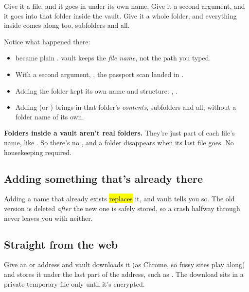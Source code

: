 \documentclass[10pt,oneside,openany]{book}
\begin{document}
Give it a file, and it goes in under its own name. Give it a second argument,
and it goes into that folder inside the vault. Give it a whole folder, and
everything inside comes along too, subfolders and all.


Notice what happened there:

\begin{itemize}
  \item {} became plain .
        vault keeps the \emph{file name}, not the path you typed.
  \item With a second argument, , the passport scan landed in
        .
  \item Adding the folder  kept its own name and
        structure: , .
  \item Adding  (or ) brings in that folder's
        \emph{contents}, subfolders and all, without a folder name of its own.
\end{itemize}

\begin{headsup}
\textbf{Folders inside a vault aren't real folders.} They're just part of each
file's name, like . So there's no , and a
folder disappears when its last file goes. No housekeeping required.
\end{headsup}

\subsection{Adding something that's already there}
Adding a name that already exists \hl{replaces} it, and vault tells you so.
The old version is deleted \emph{after} the new one is safely stored, so a
crash halfway through never leaves you with neither.

\subsection{Straight from the web}
Give  an  or  address and vault
downloads it (as Chrome, so fussy sites play along) and stores it under the
last part of the address, such as . The download sits in a
private temporary file only until it's encrypted.
\end{document}
